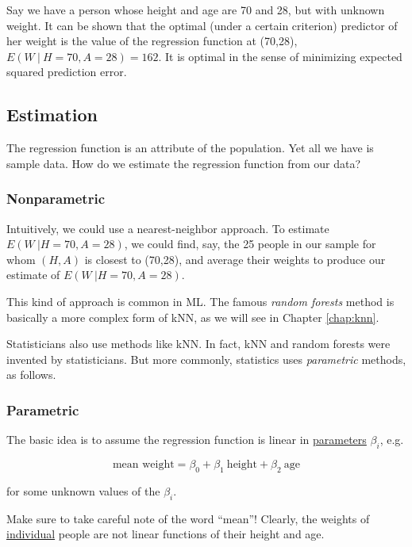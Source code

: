 Say we have a person whose height and age are 70 and 28, but with
unknown weight.  It can be shown that the optimal (under a certain
criterion) predictor of her weight is the value of the regression
function at (70,28), $E(W ~|~ H=70, A=28) = 162$.  It is optimal
in the sense of minimizing expected squared prediction error.

\subsection{Estimation}

The regression function is an attribute of the population.  Yet all we
have is sample data.  How do we estimate the regression function from
our data?

\subsubsection{Nonparametric}

Intuitively, we could use a nearest-neighbor approach.  To estimate
$E(W ~| H=70, A=28)$, we could find, say, the 25 people in our
sample for whom $(H,A)$ is closest to (70,28), and average their weights
to produce our estimate of $E(W ~| H=70, A=28)$.  

This kind of approach is common in ML.  The famous \textit{random
forests} method is basically a more complex form of kNN, as we will see
in Chapter \ref{chap:knn}.  

Statisticians also use methods like kNN.  In fact, kNN and random
forests were invented by statisticians.  But more commonly, statistics
uses \textit{parametric} methods, as follows.

\subsubsection{Parametric}

The basic idea is to assume the regression function is linear in
\underline{parameters} $\beta_i$, e.g.

\begin{equation}
\label{wthtage}
\textrm{mean weight} = \beta_0 + \beta_1 ~ \textrm{height} + \beta_2 ~ \textrm{age}
\end{equation}

for some unknown values of the $\beta_i$.

Make sure to take careful note of the word ``mean''!  Clearly, the
weights of \underline{individual} people are not linear functions of
their height and age.

